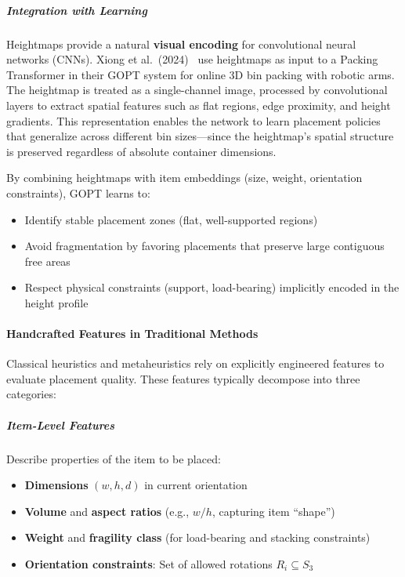 \subparagraph{Integration with Learning}

Heightmaps provide a natural \textbf{visual encoding} for convolutional neural networks (CNNs). Xiong et al.\ (2024)~\cite{XGP24} use heightmaps as input to a Packing Transformer in their GOPT system for online 3D bin packing with robotic arms. The heightmap is treated as a single-channel image, processed by convolutional layers to extract spatial features such as flat regions, edge proximity, and height gradients. This representation enables the network to learn placement policies that generalize across different bin sizes---since the heightmap's spatial structure is preserved regardless of absolute container dimensions.

By combining heightmaps with item embeddings (size, weight, orientation constraints), GOPT learns to:
\begin{itemize}
    \item Identify stable placement zones (flat, well-supported regions)
    \item Avoid fragmentation by favoring placements that preserve large contiguous free areas
    \item Respect physical constraints (support, load-bearing) implicitly encoded in the height profile
\end{itemize}


\paragraph{Handcrafted Features in Traditional Methods}

Classical heuristics and metaheuristics rely on explicitly engineered features to evaluate placement quality. These features typically decompose into three categories:

\subparagraph{Item-Level Features}
Describe properties of the item to be placed:
\begin{itemize}
    \item \textbf{Dimensions} $(w, h, d)$ in current orientation
    \item \textbf{Volume} and \textbf{aspect ratios} (e.g., $w/h$, capturing item ``shape'')
    \item \textbf{Weight} and \textbf{fragility class} (for load-bearing and stacking constraints)
    \item \textbf{Orientation constraints}: Set of allowed rotations $R_i \subseteq S_3$
\end{itemize}

